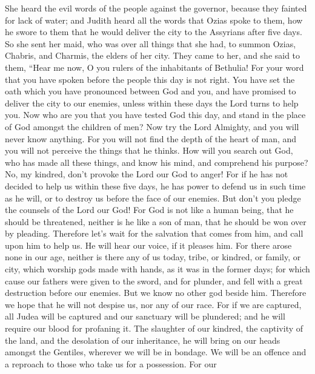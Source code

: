  She heard the evil words of the people against the
governor, because they fainted for lack of water; and Judith heard all
the words that Ozias spoke to them, how he swore to them that he would
deliver the city to the Assyrians after five days.  So she
sent her maid, who was over all things that she had, to summon Ozias,
Chabris, and Charmis, the elders of her city.  They came to
her, and she said to them, ``Hear me now, O you rulers of the
inhabitants of Bethulia! For your word that you have spoken before the
people this day is not right. You have set the oath which you have
pronounced between God and you, and have promised to deliver the city to
our enemies, unless within these days the Lord turns to help you.
 Now who are you that you have tested God this day, and
stand in the place of God amongst the children of men?  Now
try the Lord Almighty, and you will never know anything. 
For you will not find the depth of the heart of man, and you will not
perceive the things that he thinks. How will you search out God, who has
made all these things, and know his mind, and comprehend his purpose?
No, my kindred, don't provoke the Lord our God to anger! 
For if he has not decided to help us within these five days, he has
power to defend us in such time as he will, or to destroy us before the
face of our enemies.  But don't you pledge the counsels of
the Lord our God! For God is not like a human being, that he should be
threatened, neither is he like a son of man, that he should be won over
by pleading.  Therefore let's wait for the salvation that
comes from him, and call upon him to help us. He will hear our voice, if
it pleases him.  For there arose none in our age, neither
is there any of us today, tribe, or kindred, or family, or city, which
worship gods made with hands, as it was in the former days;
 for which cause our fathers were given to the sword, and
for plunder, and fell with a great destruction before our enemies.
 But we know no other god beside him. Therefore we hope
that he will not despise us, nor any of our race.  For if
we are captured, all Judea will be captured and our sanctuary will be
plundered; and he will require our blood for profaning it. 
The slaughter of our kindred, the captivity of the land, and the
desolation of our inheritance, he will bring on our heads amongst the
Gentiles, wherever we will be in bondage. We will be an offence and a
reproach to those who take us for a possession.  For our
